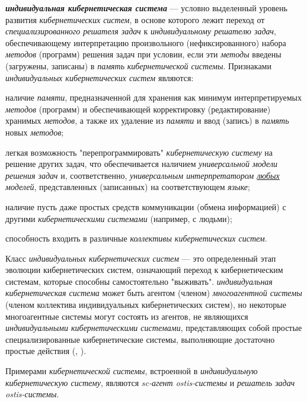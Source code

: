 \textbf{\textit{индивидуальная кибернетическая система}} --- условно выделенный уровень развития \textit{кибернетических систем}, в основе которого лежит переход от \textit{специализированного решателя задач} к \textit{индивидуальному решателю задач}, обеспечивающему интерпретацию произвольного (нефиксированного) набора \textit{методов} (программ) решения задач при условии, если эти \textit{методы} введены (загружены, записаны) в \textit{память} \textit{кибернетической системы}.
Признаками \textit{индивидуальных кибернетических систем} являются:
\begin{textitemize}
    \item наличие \textit{памяти}, предназначенной для хранения как минимум интерпретируемых \textit{методов}	(программ)  и обеспечивающей корректировку (редактирование) хранимых \textit{методов}, а также их удаление из	\textit{памяти} и ввод (запись) в \textit{память} новых \textit{методов};
    \item легкая возможность "перепрограммировать"{} \textit{кибернетическую систему} на решение других задач, что обеспечивается наличием \textit{универсальной модели решения задач} и, соответственно, \textit{универсальным интерпретатором \uline{любых} моделей}, представленных (записанных) на соответствующем \textit{языке};
    \item наличие пусть даже простых средств коммуникации (обмена информацией) с другими \textit{кибернетическими системами} (например, с людьми);
    \item способность входить в различные \textit{коллективы кибернетических систем}.
\end{textitemize}

Класс \textit{индивидуальных кибернетических систем} — это определенный этап эволюции кибернетических систем, означающий переход к кибернетическим системам, которые способны самостоятельно "выживать". \textit{индивидуальная кибернетическая система} может быть агентом (членом) \textit{многоагентной системы} (членом коллектива индивидуальных кибернетических систем), но некоторые многоагентные системы могут состоять из агентов, не являющихся \textit{индивидуальными кибернетическими системами}, представляющих собой простые специализированные кибернетические системы, выполняющие достаточно простые действия (, ).

Примерами \textit{кибернетической системы}, встроенной в \textit{индивидуальную кибернетическую систему}, являются \textit{sc-агент ostis-системы} и \textit{решатель задач ostis-системы}.

